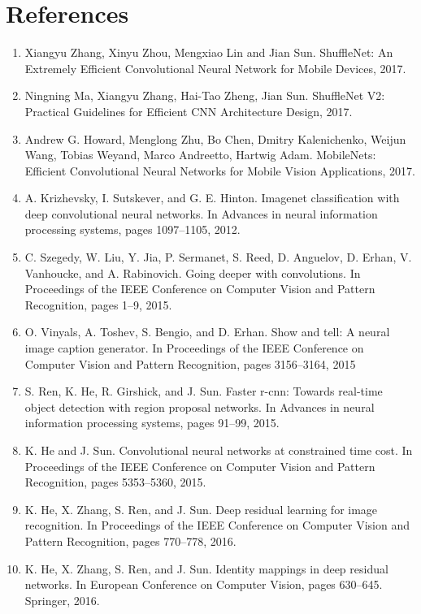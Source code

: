 \documentclass{article}
\begin{document}

\section{References}
\begin{enumerate}
    \item Xiangyu Zhang, Xinyu Zhou, Mengxiao Lin and Jian Sun. ShuffleNet: An Extremely Efficient Convolutional Neural Network for Mobile Devices, 2017.
    \item Ningning Ma, Xiangyu Zhang, Hai-Tao Zheng, Jian Sun. ShuffleNet V2: Practical Guidelines for Efficient CNN Architecture Design, 2017.
    \item Andrew G. Howard, Menglong Zhu, Bo Chen, Dmitry Kalenichenko, Weijun Wang, Tobias Weyand, Marco Andreetto, Hartwig Adam. MobileNets: Efficient Convolutional Neural Networks for Mobile Vision Applications, 2017.
    \item A. Krizhevsky, I. Sutskever, and G. E. Hinton. Imagenet classification with deep convolutional neural networks. In Advances in neural information processing systems, pages 1097–1105, 2012.
    \item C. Szegedy, W. Liu, Y. Jia, P. Sermanet, S. Reed, D. Anguelov, D. Erhan, V. Vanhoucke, and A. Rabinovich. Going deeper with convolutions. In Proceedings of the IEEE Conference on Computer Vision and Pattern Recognition, pages 1–9, 2015.
    \item O. Vinyals, A. Toshev, S. Bengio, and D. Erhan. Show and tell: A neural image caption generator. In Proceedings of the IEEE Conference on Computer Vision and Pattern Recognition, pages 3156–3164, 2015
    \item S. Ren, K. He, R. Girshick, and J. Sun. Faster r-cnn: Towards real-time object detection with region proposal networks. In Advances in neural information processing systems, pages 91–99, 2015.
    \item K. He and J. Sun. Convolutional neural networks at constrained time cost. In Proceedings of the IEEE Conference on Computer Vision and Pattern Recognition, pages 5353–5360, 2015.
    \item K. He, X. Zhang, S. Ren, and J. Sun. Deep residual learning for image recognition. In Proceedings of the IEEE Conference on Computer Vision and Pattern Recognition, pages 770–778, 2016.
    \item K. He, X. Zhang, S. Ren, and J. Sun. Identity mappings in deep residual networks. In European Conference on Computer Vision, pages 630–645. Springer, 2016.

\end{enumerate}
\end{document}
